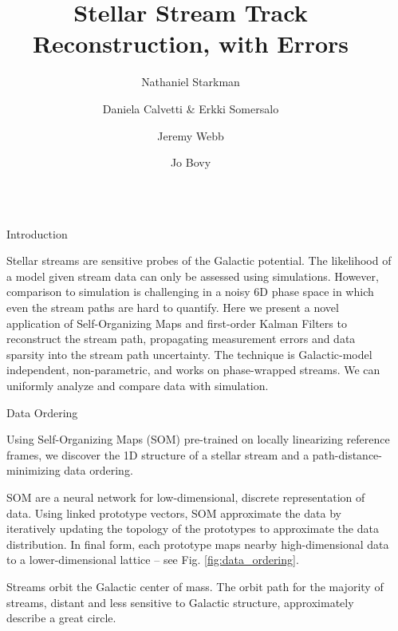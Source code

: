 \documentclass[final]{beamer}
\title{Stellar Stream Track Reconstruction, with Errors}
\author{Nathaniel Starkman \inst{1} \and Daniela Calvetti \& Erkki Somersalo \inst{2} \and Jeremy Webb \inst{1} \and Jo Bovy \inst{1}}
\institute[shortinst]{\inst{1} Astronomy and Astrophysics, University of Toronto \samelineand \inst{2} Department of Mathematics, Case Western Reserve University}
\newlength{\sepwidth}
\newlength{\colwidth}
\newcommand{\separatorcolumn}{\begin{column}{\sepwidth}\end{column}}
\begin{document}
\begin{frame}[t]
\begin{columns}[t]
\separatorcolumn

\begin{column}{\colwidth}

    \begin{alertblock}{Introduction}

        Stellar streams are sensitive probes of the Galactic potential. The likelihood of a model given stream data can only be assessed using simulations. However, comparison to simulation is challenging in a noisy 6D phase space in which even the stream paths are hard to quantify. Here we present a novel application of Self-Organizing Maps and first-order Kalman Filters to  reconstruct the stream path, propagating measurement errors and data sparsity into the stream path uncertainty. The technique is Galactic-model independent, non-parametric, and works on phase-wrapped streams. We can uniformly analyze and compare data with simulation.

    \end{alertblock}

    \begin{block}{Data Ordering}

        Using Self-Organizing Maps (SOM) pre-trained on locally linearizing reference frames, we discover the 1D structure of a stellar stream and a path-distance-minimizing data ordering.


            SOM are a neural network for low-dimensional, discrete representation of data.  Using linked prototype vectors, SOM approximate the data by iteratively updating the topology of the prototypes to approximate the data distribution. In final form, each prototype maps nearby high-dimensional data to a lower-dimensional lattice \cite{9780387733937} -- see Fig. \ref{fig:data_ordering}.


            Streams orbit the Galactic center of mass. The orbit path for the majority of streams, distant and less sensitive to Galactic structure, approximately describe a great circle. 
            

\end{block}
\end{column}
\end{columns}
\end{frame}
\end{document}
